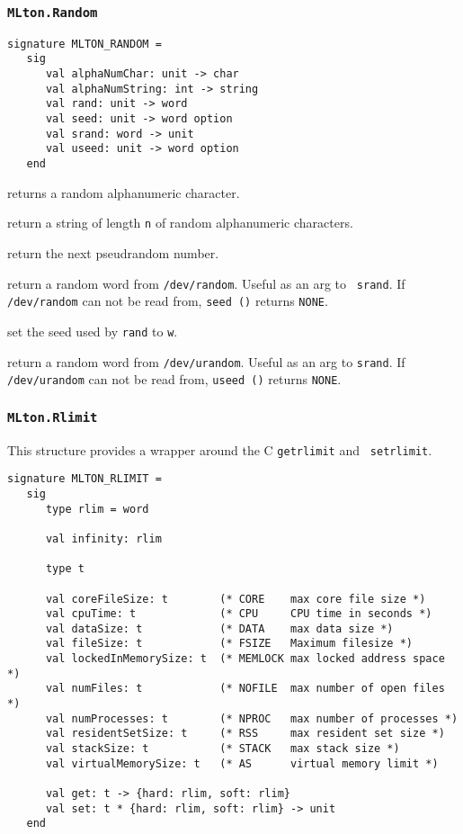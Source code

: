 \subsubsection{\tt MLton.Random}

\begin{verbatim}
signature MLTON_RANDOM =
   sig
      val alphaNumChar: unit -> char
      val alphaNumString: int -> string
      val rand: unit -> word
      val seed: unit -> word option
      val srand: word -> unit
      val useed: unit -> word option
   end
\end{verbatim}

\begin{description}
returns a random alphanumeric character.

return a string of length {\tt n} of random alphanumeric characters.

return the next pseudrandom number.

return a random word from {\tt /dev/random}.  Useful as an arg to {\tt
srand}.  If {\tt /dev/random} can not be read from, {\tt seed ()}
returns {\tt NONE}.

set the seed used by {\tt rand} to {\tt w}.

return a random word from {\tt /dev/urandom}.  Useful as an arg to
{\tt srand}.  If {\tt /dev/urandom} can not be read from, {\tt useed
()} returns {\tt NONE}.

\end{description}
%
\subsubsection{\tt MLton.Rlimit}

This structure provides a wrapper around the C {\tt getrlimit} and {\tt
setrlimit}.
\begin{verbatim}
signature MLTON_RLIMIT =
   sig
      type rlim = word
               
      val infinity: rlim

      type t
               
      val coreFileSize: t        (* CORE    max core file size *)
      val cpuTime: t             (* CPU     CPU time in seconds *)
      val dataSize: t            (* DATA    max data size *)
      val fileSize: t            (* FSIZE   Maximum filesize *)
      val lockedInMemorySize: t  (* MEMLOCK max locked address space *)
      val numFiles: t            (* NOFILE  max number of open files *)  
      val numProcesses: t        (* NPROC   max number of processes *)
      val residentSetSize: t     (* RSS     max resident set size *)
      val stackSize: t           (* STACK   max stack size *)
      val virtualMemorySize: t   (* AS      virtual memory limit *)
      
      val get: t -> {hard: rlim, soft: rlim}
      val set: t * {hard: rlim, soft: rlim} -> unit
   end
\end{verbatim}

